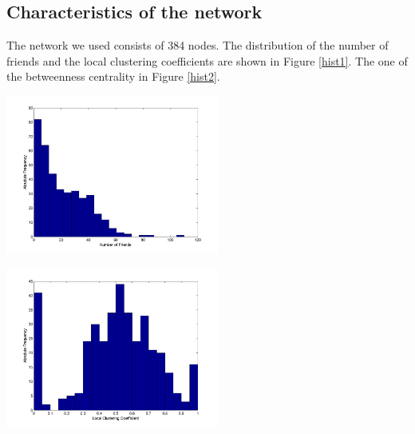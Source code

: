 
\subsection{Characteristics of the network}

The network we used consists of 384 nodes. The distribution of the number of friends and the local clustering coefficients are shown in Figure \ref{hist1}. The one of the betweenness centrality in Figure \ref{hist2}.


\begin{minipage}{0.5\textwidth}
\includegraphics[width=7cm]{network_degreehist.png}
\end{minipage}
\begin{minipage}{0.5\textwidth}
\includegraphics[width=7cm]{network_clusterhist.png}
\end{minipage}
\label{hist1}


